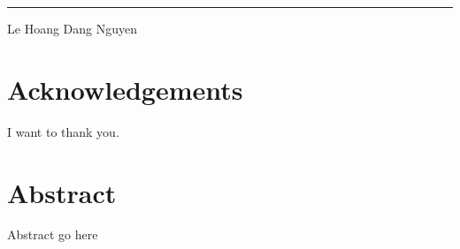 \documentclass[12pt,twoside]{report}
\begin{document}
\vspace{12cm}  %

\noindent\hfill\rule{8cm}{0.4pt}  %
\vspace{0.5cm} %

\noindent\hspace{8cm} Le Hoang Dang Nguyen %

\chapter*{\centering Acknowledgements}
I want to thank you.

\chapter*{\centering Abstract}
Abstract go here

\tableofcontents











\printbibliography[title={References}]
\end{document}

